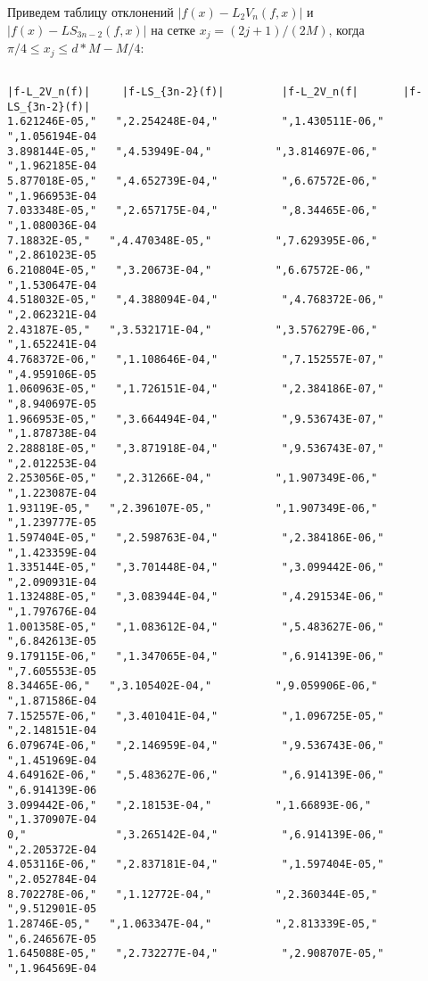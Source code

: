 \noindent Приведем таблицу отклонений  $|f(x)-L_2V_n(f,x)|$  и  $|f(x)-LS_{3n-2}(f,x)|$
на сетке  $x_j=(2j+1)/(2M)$, когда $\pi/4 \leq x_j \leq d*M-M/4$:


{\small
\begin{verbatim}

|f-L_2V_n(f)|     |f-LS_{3n-2}(f)|         |f-L_2V_n(f|       |f-LS_{3n-2}(f)|
1.621246E-05,"   ",2.254248E-04,"          ",1.430511E-06,"   ",1.056194E-04
3.898144E-05,"   ",4.53949E-04,"          ",3.814697E-06,"   ",1.962185E-04
5.877018E-05,"   ",4.652739E-04,"          ",6.67572E-06,"   ",1.966953E-04
7.033348E-05,"   ",2.657175E-04,"          ",8.34465E-06,"   ",1.080036E-04
7.18832E-05,"   ",4.470348E-05,"          ",7.629395E-06,"   ",2.861023E-05
6.210804E-05,"   ",3.20673E-04,"          ",6.67572E-06,"   ",1.530647E-04
4.518032E-05,"   ",4.388094E-04,"          ",4.768372E-06,"   ",2.062321E-04
2.43187E-05,"   ",3.532171E-04,"          ",3.576279E-06,"   ",1.652241E-04
4.768372E-06,"   ",1.108646E-04,"          ",7.152557E-07,"   ",4.959106E-05
1.060963E-05,"   ",1.726151E-04,"          ",2.384186E-07,"   ",8.940697E-05
1.966953E-05,"   ",3.664494E-04,"          ",9.536743E-07,"   ",1.878738E-04
2.288818E-05,"   ",3.871918E-04,"          ",9.536743E-07,"   ",2.012253E-04
2.253056E-05,"   ",2.31266E-04,"          ",1.907349E-06,"   ",1.223087E-04
1.93119E-05,"   ",2.396107E-05,"          ",1.907349E-06,"   ",1.239777E-05
1.597404E-05,"   ",2.598763E-04,"          ",2.384186E-06,"   ",1.423359E-04
1.335144E-05,"   ",3.701448E-04,"          ",3.099442E-06,"   ",2.090931E-04
1.132488E-05,"   ",3.083944E-04,"          ",4.291534E-06,"   ",1.797676E-04
1.001358E-05,"   ",1.083612E-04,"          ",5.483627E-06,"   ",6.842613E-05
9.179115E-06,"   ",1.347065E-04,"          ",6.914139E-06,"   ",7.605553E-05
8.34465E-06,"   ",3.105402E-04,"          ",9.059906E-06,"   ",1.871586E-04
7.152557E-06,"   ",3.401041E-04,"          ",1.096725E-05,"   ",2.148151E-04
6.079674E-06,"   ",2.146959E-04,"          ",9.536743E-06,"   ",1.451969E-04
4.649162E-06,"   ",5.483627E-06,"          ",6.914139E-06,"   ",6.914139E-06
3.099442E-06,"   ",2.18153E-04,"          ",1.66893E-06,"   ",1.370907E-04
0,"              ",3.265142E-04,"          ",6.914139E-06,"   ",2.205372E-04
4.053116E-06,"   ",2.837181E-04,"          ",1.597404E-05,"   ",2.052784E-04
8.702278E-06,"   ",1.12772E-04,"          ",2.360344E-05,"   ",9.512901E-05
1.28746E-05,"   ",1.063347E-04,"          ",2.813339E-05,"   ",6.246567E-05
1.645088E-05,"   ",2.732277E-04,"          ",2.908707E-05,"   ",1.964569E-04

\end{verbatim}}
